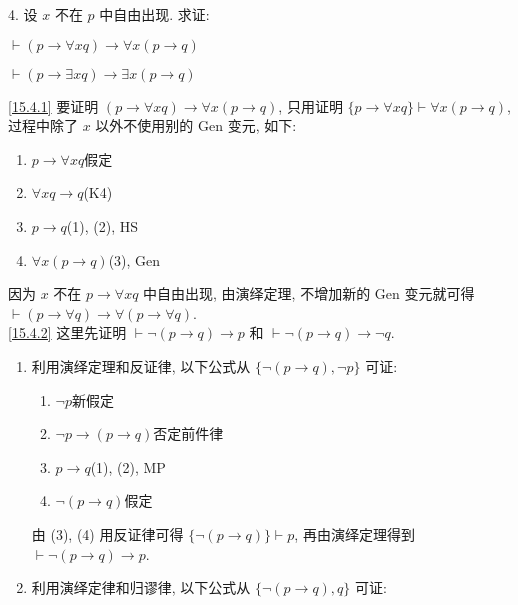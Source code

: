 \documentclass[boxes]{homework}
\begin{document}
\setlength\abovedisplayskip{.125em}
\setlength\belowdisplayskip{.125em}
\begin{problem}
4. 设 $x$ 不在 $p$ 中自由出现. 求证:
\begin{parts}[n]
    \item \label{15.4.1} $\vdash (p\to \forall xq)\to \forall x(p\to q)$
    \item \label{15.4.2} $\vdash (p\to \exists xq)\to \exists x(p\to q)$
\end{parts}
\end{problem}

\begin{solution}
    \ref{15.4.1} 要证明 $(p\to \forall xq)\to \forall x(p\to q)$, 只用证明 $\{p\to \forall xq\}\vdash \forall x(p\to q)$, 过程中除了 $x$ 以外不使用别的 Gen 变元, 如下:
    \begin{enumerate}[label = (\arabic*), parsep = 0pt, itemsep = 0pt, topsep = .25em]
        \item $p\to \forall xq$\hfill 假定
        \item $\forall xq\to q$\hfill (K4)
        \item $p\to q$\hfill (1), (2), HS
        \item $\forall x(p\to q)$\hfill (3), Gen
    \end{enumerate}
    因为 $x$ 不在 $p\to \forall xq$ 中自由出现, 由演绎定理, 不增加新的 Gen 变元就可得 $\vdash (p\to \forall q)\to \forall (p\to \forall q)$.
    \\
    \ref{15.4.2} 这里先证明 $\vdash \lnot (p\to q)\to p$ 和 $\vdash \lnot (p\to q)\to \lnot q$.
    \begin{enumerate}[parsep = 0pt, itemsep = .25em, topsep = .25em]
        \item 利用演绎定理和反证律, 以下公式从 $\{\lnot (p\to q), \lnot p\}$ 可证:
              \begin{enumerate}[label = (\arabic*), parsep = 0pt, itemsep = 0pt, topsep = .25em]
                  \item $\lnot p$\hfill 新假定
                  \item $\lnot p\to (p\to q)$\hfill 否定前件律
                  \item $p\to q$\hfill (1), (2), MP
                  \item $\lnot (p\to q)$\hfill 假定
              \end{enumerate}
              由 (3), (4) 用反证律可得 $\{\lnot(p\to q)\}\vdash p$, 再由演绎定理得到 $\vdash \lnot (p\to q)\to p$.
        \item 利用演绎定律和归谬律, 以下公式从 $\{\lnot(p\to q), q\}$ 可证:

\end{enumerate}
\end{solution}
\end{document}
